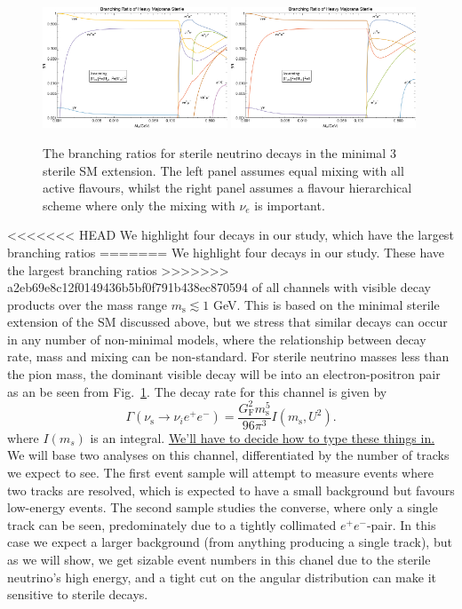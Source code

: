 \documentclass[11pt, a4paper]{article}
\newcommand{\reffig}[1]{Fig.~\ref{#1}}
\newcommand{\newtext}[2]{\textcolor{#1}{\ul{#2}}}
\begin{document}
\begin{figure}[t]
\includegraphics[width=0.49\textwidth]{figures/bounds1.pdf}  \includegraphics[width=0.49\textwidth]{figures/bounds2.pdf}
\caption{\label{fig:branchingratios}The branching ratios for sterile neutrino decays in the minimal 3 sterile SM extension. The left panel assumes equal mixing with all active flavours, whilst the right panel assumes a flavour hierarchical scheme where only the mixing with $\nu_e$ is important.}
\end{figure}

<<<<<<< HEAD
We highlight four decays in our study, which have the largest branching ratios
=======
We highlight four decays in our study. These have the largest branching ratios
>>>>>>> a2eb69e8c12f0149436b5bf0f791b438ec870594
of all channels with visible decay products over the mass range $m_\text{s}
\lesssim 1$ GeV. This is based on the minimal sterile extension of the SM
discussed above, but we stress that similar decays can occur in any number of
non-minimal models, where the relationship between decay rate, mass and mixing
can be non-standard. For sterile neutrino masses less than the pion mass, the
dominant visible decay will be into an electron-positron pair as an be seen
from \reffig{fig:branchingratios}. The decay rate for this channel is given by 
%
\[ \Gamma\left(\nu_\text{s}\to \nu_i e^+e^-\right) =
\frac{G_\text{F}^2m_\text{s}^5}{96\pi^3}I(m_\text{s}, U^2).  \]
%
where $I(m_s)$ is an integral. \newtext{PB}{We'll have to decide how to type these things in.}
%
We will base two analyses on this channel, differentiated by the number of
tracks we expect to see. The first event sample will attempt to measure events
where two tracks are resolved, which is expected to have a small background but
favours low-energy events. The second sample studies the converse, where only a
single track can be seen, predominately due to a tightly collimated
$e^+e^-$-pair. In this case we expect a larger background (from anything
producing a single track), but as we will show, we get sizable event numbers in
this chanel due to the sterile neutrino's high energy, and a tight cut on the
angular distribution can make it sensitive to sterile decays.
\end{document}
